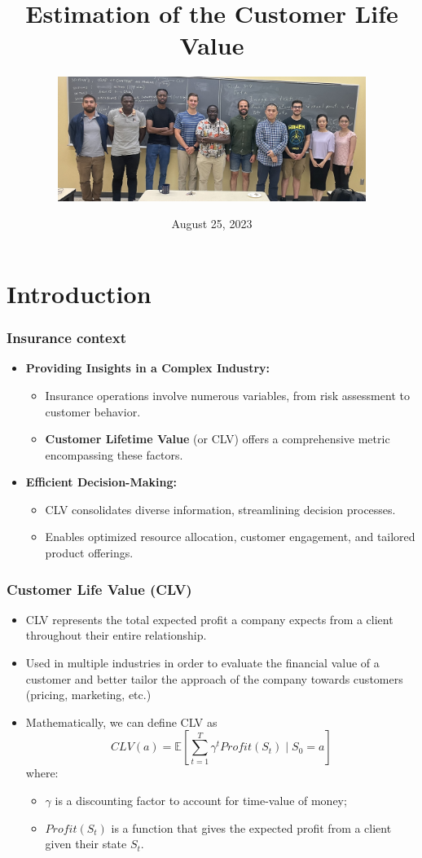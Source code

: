 \documentclass[aspectratio=169,xcolor=x11names,compress]{beamer}
\title{Estimation of the Customer Life Value}
\author{\includegraphics[width=10cm]{title_image.jpeg}}
\date{August 25, 2023}
\newcommand{\E}{\mathbb{E}}
\begin{document}
\maketitle


\section{Introduction}

\begin{frame}
\frametitle{Insurance context}

\begin{itemize}
  \item \textbf{Providing Insights in a Complex Industry:}
  \begin{itemize}
    \item Insurance operations involve numerous variables, from risk assessment to customer behavior.
    \item \textbf{Customer Lifetime Value} (or CLV) offers a comprehensive metric encompassing these factors.
  \end{itemize}
  
  \item \textbf{Efficient Decision-Making:}
  \begin{itemize}
    \item CLV consolidates diverse information, streamlining decision processes.
    \item Enables optimized resource allocation, customer engagement, and tailored product offerings.
  \end{itemize}
\end{itemize}

\end{frame}

\begin{frame}
\frametitle{Customer Life Value (CLV)}

\begin{itemize}
    \item CLV represents the total expected profit a
    company expects from a client throughout their entire relationship.
    \item Used in multiple industries in order to evaluate the financial value of a
    customer and better tailor the approach of the company towards
    customers (pricing, marketing, etc.) 

\item Mathematically, we can define CLV as
\[
CLV(a) = \E\left[\sum_{t=1}^T \gamma^t Profit(S_t)\mid S_0 = a\right]
\]
where:
\begin{itemize}
    \item $\gamma$ is a discounting factor to account for time-value of money;
    \item $Profit(S_t)$ is a function that gives the expected profit from a client given their state $S_t$.
\end{itemize}

\end{itemize}
\end{frame}
\end{document}
